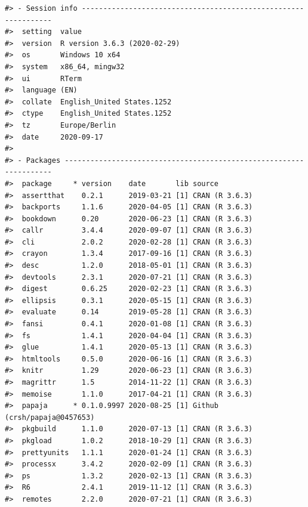 \documentclass[
  english,
  doc,floatsintext,draftall]{apa6}
\begin{document}
\begin{verbatim}
#> - Session info ---------------------------------------------------------------
#>  setting  value                       
#>  version  R version 3.6.3 (2020-02-29)
#>  os       Windows 10 x64              
#>  system   x86_64, mingw32             
#>  ui       RTerm                       
#>  language (EN)                        
#>  collate  English_United States.1252  
#>  ctype    English_United States.1252  
#>  tz       Europe/Berlin               
#>  date     2020-09-17                  
#> 
#> - Packages -------------------------------------------------------------------
#>  package     * version    date       lib source                      
#>  assertthat    0.2.1      2019-03-21 [1] CRAN (R 3.6.3)              
#>  backports     1.1.6      2020-04-05 [1] CRAN (R 3.6.3)              
#>  bookdown      0.20       2020-06-23 [1] CRAN (R 3.6.3)              
#>  callr         3.4.4      2020-09-07 [1] CRAN (R 3.6.3)              
#>  cli           2.0.2      2020-02-28 [1] CRAN (R 3.6.3)              
#>  crayon        1.3.4      2017-09-16 [1] CRAN (R 3.6.3)              
#>  desc          1.2.0      2018-05-01 [1] CRAN (R 3.6.3)              
#>  devtools      2.3.1      2020-07-21 [1] CRAN (R 3.6.3)              
#>  digest        0.6.25     2020-02-23 [1] CRAN (R 3.6.3)              
#>  ellipsis      0.3.1      2020-05-15 [1] CRAN (R 3.6.3)              
#>  evaluate      0.14       2019-05-28 [1] CRAN (R 3.6.3)              
#>  fansi         0.4.1      2020-01-08 [1] CRAN (R 3.6.3)              
#>  fs            1.4.1      2020-04-04 [1] CRAN (R 3.6.3)              
#>  glue          1.4.1      2020-05-13 [1] CRAN (R 3.6.3)              
#>  htmltools     0.5.0      2020-06-16 [1] CRAN (R 3.6.3)              
#>  knitr         1.29       2020-06-23 [1] CRAN (R 3.6.3)              
#>  magrittr      1.5        2014-11-22 [1] CRAN (R 3.6.3)              
#>  memoise       1.1.0      2017-04-21 [1] CRAN (R 3.6.3)              
#>  papaja      * 0.1.0.9997 2020-08-25 [1] Github (crsh/papaja@0457653)
#>  pkgbuild      1.1.0      2020-07-13 [1] CRAN (R 3.6.3)              
#>  pkgload       1.0.2      2018-10-29 [1] CRAN (R 3.6.3)              
#>  prettyunits   1.1.1      2020-01-24 [1] CRAN (R 3.6.3)              
#>  processx      3.4.2      2020-02-09 [1] CRAN (R 3.6.3)              
#>  ps            1.3.2      2020-02-13 [1] CRAN (R 3.6.3)              
#>  R6            2.4.1      2019-11-12 [1] CRAN (R 3.6.3)              
#>  remotes       2.2.0      2020-07-21 [1] CRAN (R 3.6.3)              

\end{verbatim}
\end{document}
